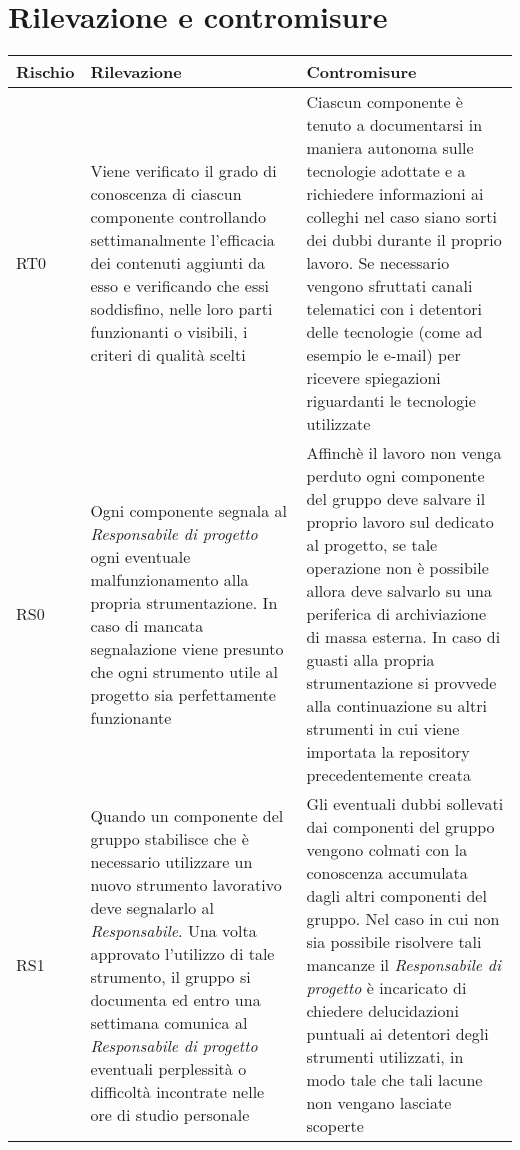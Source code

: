 \documentclass[../PianodiProgetto.tex]{subfiles}
\begin{document}
	\section {Rilevazione e contromisure}
	

		\begin{longtable}{|p{15mm}|p{60mm}|p{60mm}|}
			\hline
			 \textbf{Rischio}& \textbf{Rilevazione}&\textbf{Contromisure}\\ \hline
			 RT0& Viene verificato il grado di conoscenza di ciascun componente controllando settimanalmente l'efficacia dei contenuti aggiunti da esso e verificando che essi soddisfino, nelle loro parti funzionanti o visibili, i criteri di qualità scelti & Ciascun componente è tenuto a documentarsi in maniera autonoma sulle tecnologie adottate e a richiedere informazioni ai colleghi nel caso siano sorti dei dubbi durante il proprio lavoro. Se necessario vengono sfruttati canali telematici con i detentori delle tecnologie (come ad esempio le e-mail) per ricevere spiegazioni riguardanti le tecnologie utilizzate\\ \hline
			 RS0& Ogni componente segnala al \textit{Responsabile di progetto} ogni eventuale malfunzionamento  alla propria strumentazione. In caso di mancata segnalazione viene presunto che ogni strumento utile al progetto sia perfettamente funzionante & Affinchè il lavoro non venga perduto ogni componente del gruppo deve salvare il proprio lavoro sul \glossario{repository}{Repository} \glossario{GitHub}{GitHub} dedicato al progetto, se tale operazione non è possibile allora deve salvarlo su una periferica di archiviazione di massa esterna. In caso di guasti alla propria strumentazione si provvede alla continuazione su altri strumenti in cui viene importata la repository precedentemente creata\\ \hline
			 \hline RS1& Quando un componente del gruppo stabilisce che è necessario utilizzare un nuovo strumento lavorativo deve segnalarlo al  \textit{Responsabile}. Una volta approvato l'utilizzo di tale strumento, il gruppo si documenta ed entro una settimana comunica al \textit{Responsabile di progetto} eventuali perplessità o difficoltà incontrate nelle ore di studio personale & Gli eventuali dubbi sollevati dai componenti del gruppo vengono colmati con la conoscenza accumulata dagli altri componenti del gruppo. Nel caso in cui non sia possibile risolvere tali mancanze il \textit{Responsabile di progetto} è incaricato di chiedere delucidazioni puntuali ai detentori degli strumenti utilizzati, in modo tale che tali lacune non vengano lasciate scoperte\\ \hline

\end{longtable}
\end{document}
